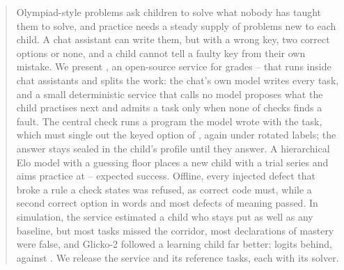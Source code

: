 \begin{abstract}
Olympiad-style problems ask children to solve what nobody has taught them to solve, and practice needs a steady supply of problems new to each child. A chat assistant can write them, but with a wrong key, two correct options or none, and a child cannot tell a faulty key from their own mistake. We present \System, an open-source service for grades -- that runs inside chat assistants and splits the work: the chat's own model writes every task, and a small deterministic service that calls no model proposes what the child practises next and admits a task only when none of  checks finds a fault. The central check runs a program the model wrote with the task, which must single out the keyed option of , again under rotated labels; the answer stays sealed in the child's profile until they answer. A hierarchical Elo model with a guessing floor places a new child with a trial series and aims practice at --\pct{} expected success. Offline, every injected defect that broke a rule a check states was refused, as correct code must, while a second correct option in words and most defects of meaning passed. In simulation, the service estimated a child who stays put as well as any baseline, but most tasks missed the corridor, most declarations of mastery were false, and Glicko-2 followed a learning child far better:  logits behind, against . We release the service and its  reference tasks, each with its solver.
\end{abstract}
